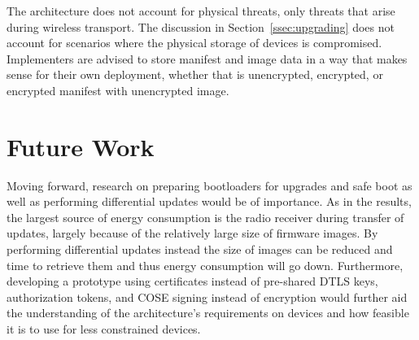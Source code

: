 \documentclass[0-thesis.tex]{subfiles}
\begin{document}
The architecture does not account for physical threats, only threats that arise during
wireless transport. The discussion in Section~\ref{ssec:upgrading} does not account for
scenarios where the physical storage of devices is compromised. Implementers are advised
to store manifest and image data in a way that makes sense for their own deployment,
whether that is unencrypted, encrypted, or encrypted manifest with unencrypted image.


\section{Future Work}
\label{sec:future-work}
Moving forward, research on preparing bootloaders for upgrades and safe boot as well as
performing differential updates would be of importance. As in the results, the largest
source of energy consumption is the radio receiver during transfer of updates, largely
because of the relatively large size of firmware images. By performing differential
updates instead the size of images can be reduced and time to retrieve them and thus
energy consumption will go down. Furthermore, developing a prototype using certificates
instead of pre-shared DTLS keys, authorization tokens, and COSE signing instead of
encryption would further aid the understanding of the architecture's requirements on
devices and how feasible it is to use for less constrained devices. 
\end{document}
